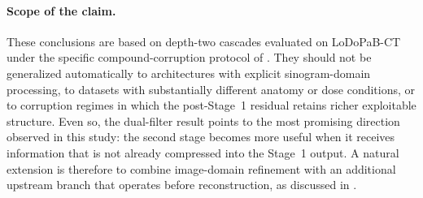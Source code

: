 \paragraph{Scope of the claim.}
These conclusions are based on depth-two cascades evaluated on LoDoPaB-CT under the specific compound-corruption protocol of . They should not be generalized automatically to architectures with explicit sinogram-domain processing, to datasets with substantially different anatomy or dose conditions, or to corruption regimes in which the post-Stage~1 residual retains richer exploitable structure. Even so, the dual-filter result points to the most promising direction observed in this study: the second stage becomes more useful when it receives information that is not already compressed into the Stage~1 output. A natural extension is therefore to combine image-domain refinement with an additional upstream branch that operates before reconstruction, as discussed in .